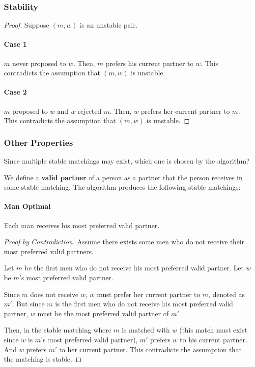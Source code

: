 \documentclass[a4paper,12pt]{article}
\begin{document}
\subsubsection{Stability}

\begin{proof}
Suppose $(m, w)$ is an unstable pair. 

\paragraph{Case 1} $m$ never proposed to $w$. Then, $m$ prefers his current partner to $w$. This contradicts the assumption that $(m, w)$ is unstable.

\paragraph{Case 2} $m$ proposed to $w$ and $w$ rejected $m$. Then, $w$ prefers her current partner to $m$. This contradicts the assumption that $(m, w)$ is unstable.
\end{proof}

\subsubsection{Other Properties}

Since multiple stable matchings may exist, which one is chosen by the algorithm?

We define a \textbf{valid partner} of a person as a partner that the person receives in some stable matching. The algorithm produces the following stable matchings:

\paragraph{Man Optimal} Each man receives his most preferred valid partner.

\begin{proof}[Proof by Contradiction]
Assume there exists some men who do not receive their most preferred valid partners. 

Let $m$ be the first men who do not receive his most preferred valid partner. Let $w$ be $m$'s most preferred valid partner. 

Since $m$ does not receive $w$, $w$ must prefer her current partner to $m$, denoted as $m'$. But since $m$ is the first men who do not receive his most preferred valid partner, $w$ must be the most preferred valid partner of $m'$.

Then, in the stable matching where $m$ is matched with $w$ (this match must exist since $w$ is $m$'s most preferred valid partner), $m'$ prefers $w$ to his current partner. And $w$ prefers $m'$ to her current partner. This contradicts the assumption that the matching is stable.
\end{proof}
\end{document}
